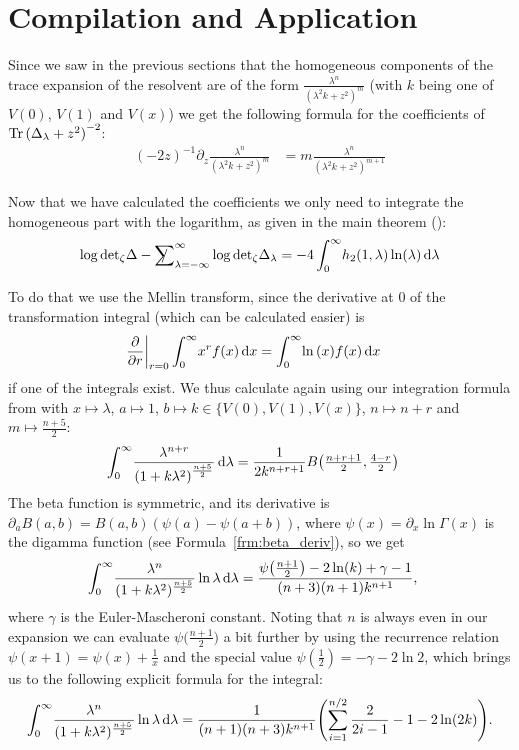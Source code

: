 \section{Compilation and Application}
Since we saw in the previous sections that the homogeneous components of the
trace expansion of the resolvent are of the form $\frac{\lambda^n}{(\lambda^2 k
+ z^2)^m}$ (with $k$ being one of $V(0)$, $V(1)$ and $V(x)$) we get the
following formula for the coefficients of $\Tr{(\Delta_\lambda + z^2)}^{-2}$:
\begin{align}
  (-2z)^{-1} \partial_z \frac{\lambda^n}{(\lambda^2 k + z^2)^{m}}
    &= m \frac{\lambda^n}{(\lambda^2 k + z^2)^{m+1}}
\end{align}

Now that we have calculated the coefficients we only need to integrate the
homogeneous part with the logarithm, as given in the main theorem (\cite[Thm
1.4]{LV13}):
\begin{align*}
  \log\zdet\Delta - \Regsum_{\lambda=-\infty}^\infty \log\zdet\Delta_\lambda =
  -4 \Integ[\infty]{0}{\lambda}{h_2(1,\lambda)\ln(\lambda)}
\end{align*}

To do that we use the Mellin transform, since the derivative at $0$ of the
transformation integral (which can be calculated easier) is
\begin{align*}
    \left.\frac\partial{\partial r}\right|_{r=0}\Integ[\infty]{0}{x}{x^r f(x)}
    &= \Integ[\infty]{0}{x}{\ln{(x)} f(x)}
\end{align*}
if one of the integrals exist. We thus calculate again using our integration
formula from  with $x\mapsto \lambda$, $a \mapsto 1$,
$b \mapsto k \in\{V(0), V(1), V(x)\}$, $n \mapsto n + r$ and $m \mapsto
\tfrac{n+5}{2}$:
\begin{align*}
    \Integ[\infty]{0}{\lambda}{\frac{\lambda^{n + r}}{\left(1 +
    k\lambda^2\right)^{\frac{n+5}{2}}}} &=
      \frac{1}{2k^{n+r+1}} B\bigl(\tfrac{n+r+1}{2}, \tfrac{4-r}{2}\bigr)
\end{align*}
The beta function is symmetric, and its derivative is $\partial_a B(a,b) =
B(a,b) (\psi(a) - \psi(a+b))$, where $\psi(x) = \partial_x \ln\Gamma(x)$ is the
digamma function (see Formula~\ref{frm:beta_deriv}), so we get
\begin{align*}
  \Integ[\infty]{0}{\lambda}{
    \frac{\lambda^n}{(1 + k\lambda^2)^{\frac{n+5}{2}}}\ln\lambda
  } &=
      \frac{
        \psi\bigl(\frac{n+1}{2}\bigr) - 2\ln(k) + \gamma - 1
      }{
           (n+3)(n+1)k^{n+1}
      },
\end{align*}
where $\gamma$ is the Euler-Mascheroni constant. Noting that $n$ is always even
in our expansion we can evaluate $\psi\bigl(\tfrac{n+1}{2}\bigr)$ a bit further
by using the recurrence relation $\psi(x + 1) = \psi(x) + \tfrac{1}{x}$ and the
special value $\psi(\tfrac{1}{2}) = -\gamma - 2\ln 2$, which brings us to the
following explicit formula for the integral:
\begin{align}
  \Integ[\infty]{0}{\lambda}{
    \frac{\lambda^n}{(1 + k \lambda^2)^{\frac{n+5}{2}}}
    \ln\lambda
  } = \frac{1}{(n+1)(n+3)k^{n+1}}
  \Biggl( \sum_{i=1}^{n/2}\frac{2}{2i - 1} -1 - 2\ln(2k) \Biggr).
\end{align}

